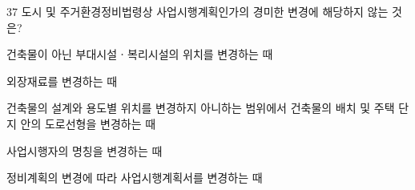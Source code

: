 \begin{question}{37}
도시 및 주거환경정비법령상 사업시행계획인가의 경미한 변경에 해당하지 않는 것은?
\begin{choices}
  \item 건축물이 아닌 부대시설ㆍ복리시설의 위치를 변경하는 때
  \item 외장재료를 변경하는 때
  \item 건축물의 설계와 용도별 위치를 변경하지 아니하는 범위에서 건축물의 배치 및 주택 단지 안의 도로선형을 변경하는 때
  \item 사업시행자의 명칭을 변경하는 때
  \item 정비계획의 변경에 따라 사업시행계획서를 변경하는 때
\end{choices}
\end{question}
